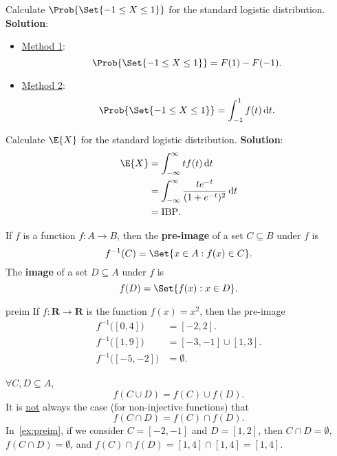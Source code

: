 \begin{Example}{}{}
    Calculate $ \Prob{\Set{-1\le X\le 1}} $ for the standard logistic distribution.
    \tcblower{}
    \textbf{Solution}:
    \begin{itemize}
        \item \underline{Method 1}:
              \[ \Prob{\Set{-1\le X\le 1}}=F(1)-F(-1). \]
        \item \underline{Method 2}:
              \[  \Prob{\Set{-1\le X\le 1}}=\int_{-1}^{1}f(t)\odif{t}. \]
    \end{itemize}
\end{Example}
\begin{Example}{}{}
    Calculate $ \E{X} $ for the standard logistic distribution.
    \tcblower{}
    \textbf{Solution}:
    \begin{align*}
        \E{X}
         & =\int_{-\infty}^{\infty}t f(t)\odif{t}                        \\
         & =\int_{-\infty}^{\infty}\frac{t e^{-t}}{(1+e^{-t})^2}\odif{t} \\
         & =\text{IBP}.
    \end{align*}
\end{Example}
\begin{Definition}{}{}
    If $ f $ is a function $ f\colon A\to B $, then
    the \textbf{pre-image} of a set
    $ C\subseteq B $ under $ f $ is
    \[ f^{-1}(C)=\Set{x\in A\given f(x)\in C}. \]
    The \textbf{image} of a set $ D\subseteq A $
    under $ f $ is
    \[ f(D)=\Set{f(x)\given x\in D}. \]
\end{Definition}
\begin{Example}{}{preim}
    If $ f\colon \mathbf{R}\to\mathbf{R} $ is the function
    $ f(x)=x^2 $, then the pre-image
    \begin{align*}
        f^{-1}\bigl([0,4]\bigr)   & =[-2,2].            \\
        f^{-1}\bigl([1,9]\bigr)   & =[-3,-1]\cup [1,3]. \\
        f^{-1}\bigl([-5,-2]\bigr) & =\emptyset.
    \end{align*}
\end{Example}
\begin{Remark}{}{}
    $\forall C,D\subseteq A $,
    \[ f(C\cup D)=f(C)\cup f(D). \]
    It is \underline{not} always the case (for non-injective functions)
    that
    \[ f(C\cap D)=f(C)\cap f(D). \]
    In~\ref{ex:preim}, if we consider $ C=[-2,-1] $ and $ D=[1,2] $, then
    $ C\cap D=\emptyset $, $ f(C\cap D)=\emptyset $, and
    $ f(C)\cap f(D)=[1,4]\cap [1,4]=[1,4] $.
\end{Remark}
